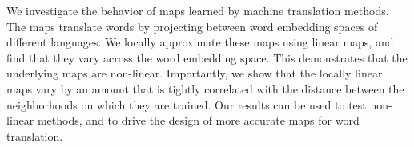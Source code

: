 We investigate the behavior of maps learned by machine translation methods. The maps translate words by projecting between word embedding spaces of different languages. We locally approximate these maps using linear maps, and find that they vary across the word embedding space. This demonstrates that the underlying maps are non-linear. Importantly, we show that the locally linear maps vary by an amount that is tightly correlated with the distance between the neighborhoods on which they are trained. Our results can be used to test non-linear methods, and to drive the design of more accurate maps for word translation.
